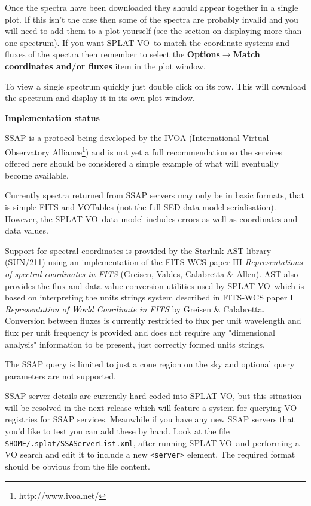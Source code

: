 \documentclass[twoside,11pt]{article}
\newcommand{\htmladdnormallinkfoot}[2]{#1\footnote{#2}}
\newcommand{\htmlref}[2]{#1}
\newcommand{\latexhtml}[2]{#1}
\newcommand{\xref}[3]{#1}
\renewcommand{\_}{\texttt{\symbol{95}}}
\newcommand{\SPLAT}{\textsf{SPLAT-VO}}
\newcommand{\submenuitem}[2]{\latexhtml{\textbf{#1$\rightarrow$#2}}{\textbf{#1->#2}}}
\newcommand{\hitext}[1]{\texttt{#1}}
\newcommand{\subheading}[1]{\textbf{\large{#1}}}
\begin{document}
Once the spectra have been downloaded they should appear together in a single
plot. If this isn't the case then some of the spectra are probably invalid and
you will need to add them to a plot yourself (see the section on
\htmlref{displaying more than one spectrum}{displaying_more_than_one_spectrum}).
If you want \SPLAT\ to match the coordinate systems and fluxes of the spectra
then remember to select the
\submenuitem{Options}{Match coordinates and/or fluxes}
item in the plot window.

To view a single spectrum quickly just double click on its row. This will
download the spectrum and display it in its own plot window.

\subheading{Implementation status}

SSAP is a protocol being developed by the IVOA
(\htmladdnormallinkfoot{International Virtual Observatory Alliance}
{http://www.ivoa.net/}) and is not yet a full recommendation so the services
offered here should be considered a simple example of what will eventually
become available.

Currently spectra returned from SSAP servers may only be in basic formats,
that is simple FITS and VOTables (not the full SED data model serialisation).
However, the \SPLAT\ data model includes errors as well as coordinates and
data values.

Support for spectral coordinates is provided by the Starlink AST library
(\xref{SUN/211}{sun211}{}) using an implementation of the FITS-WCS paper III
\textit{Representations of spectral coordinates in FITS}
(Greisen,
Valdes, Calabretta \& Allen).
AST also provides the flux and data value conversion utilities used by
\SPLAT\ which is based on interpreting the units strings system described
in FITS-WCS paper I \textit{Representation of World Coordinate in FITS}
by Greisen \& Calabretta.
Conversion between fluxes is currently restricted to flux per unit wavelength
and flux per unit frequency is provided and does not require any "dimensional
analysis" information to be present, just correctly formed units strings.

The SSAP query is limited to just a cone region on the sky and optional query
parameters are not supported.

SSAP server details are currently hard-coded into \SPLAT, but this situation
will be resolved in the next release which will feature a system for querying
VO registries for SSAP services. Meanwhile if you have any new SSAP servers
that you'd like to test you can add these by hand. Look at the file
\hitext{\$HOME/.splat/SSAServerList.xml}, after running \SPLAT\ and performing
a VO search and edit it to include a new \hitext{<server>} element. The
required format should be obvious from the file content.
\end{document}
